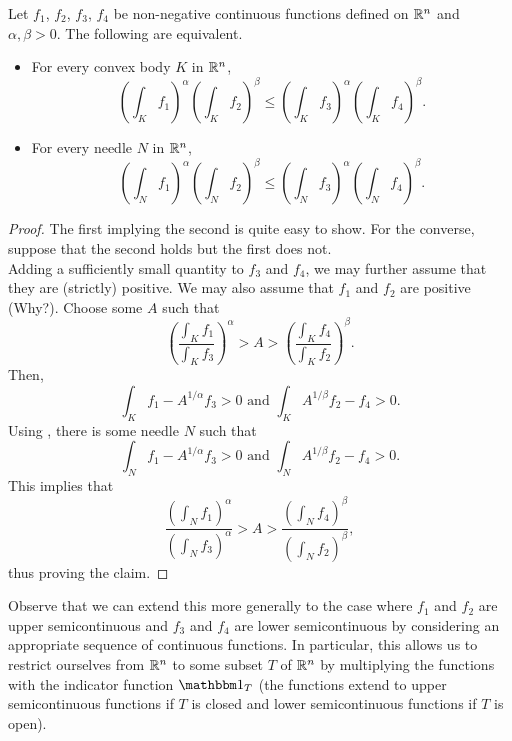 		\begin{lemma}
			\label{lem: 5.1}
			Let $f_1$, $f_2$, $f_3$, $f_4$ be non-negative continuous functions defined on $\mathbb{R}^n$ and $\alpha,\beta>0$. The following are equivalent.
			\begin{itemize}
				\item For every convex body $K$ in $\mathbb{R}^n$,
					\[ \left(\int_K f_1\right)^\alpha \left(\int_K f_2\right)^\beta \leq \left(\int_K f_3\right)^\alpha \left(\int_K f_4\right)^\beta. \]
				\item For every needle $N$ in $\mathbb{R}^n$,
					\[ \left(\int_N f_1\right)^\alpha \left(\int_N f_2\right)^\beta \leq \left(\int_N f_3\right)^\alpha \left(\int_N f_4\right)^\beta. \]
			\end{itemize}
		\end{lemma}
		\begin{proof}
			The first implying the second is quite easy to show. For the converse, suppose that the second holds but the first does not.\\
			Adding a sufficiently small quantity to $f_3$ and $f_4$, we may further assume that they are (strictly) positive. We may also assume that $f_1$ and $f_2$ are positive (Why?). Choose some $A$ such that
			\[ \left(\frac{\int_K f_1}{\int_K f_3}\right)^\alpha > A > \left(\frac{\int_K f_4}{\int_K f_2}\right)^\beta. \]
			Then,
			\[ \int_K f_1 - A^{1/\alpha}f_3 > 0 \text{ and } \int_K A^{1/\beta}f_2 - f_4 > 0. \]
			Using , there is some needle $N$ such that
			\[ \int_N f_1 - A^{1/\alpha}f_3 > 0 \text{ and } \int_N A^{1/\beta}f_2 - f_4 > 0. \]
			This implies that
			\[ \frac{\left(\int_N f_1\right)^\alpha}{\left(\int_N f_3\right)^\alpha} > A > \frac{\left(\int_N f_4\right)^\beta}{\left(\int_N f_2\right)^\beta}, \]
			thus proving the claim.
		\end{proof}

		Observe that we can extend this more generally to the case where $f_1$ and $f_2$ are upper semicontinuous and $f_3$ and $f_4$ are lower semicontinuous by considering an appropriate sequence of continuous functions. In particular, this allows us to restrict ourselves from $\mathbb{R}^n$ to some subset $T$ of $\mathbb{R}^n$ by multiplying the functions with the indicator function $\indic_T$ (the functions extend to upper semicontinuous functions if $T$ is closed and lower semicontinuous functions if $T$ is open).

